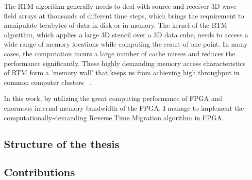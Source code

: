 The RTM algorithm generally needs to deal with source and receiver
3D wave field arrays at thousands of different time steps, which brings
the requirement to manipulate terabytes of data in disk or in memory.
The kernel of the RTM algorithm, which applies a large 3D stencil
over a 3D data cube, needs to access a wide range of memory locations
while computing the result of one point. In many cases, the computation
incurs a large number of cache misses and reduces the performance
significantly. These highly demanding memory access characteristics
of RTM form a 'memory wall' that keeps us from achieving high throughput
in common computer clusters ~\cite{fu11}.

In this work, by utilizing the great computing performance of FPGA
and enormous internal memory bandwidth of the FPGA, I manage to implement
the computationally-demanding Reverse Time Migration algorithm in
FPGA.

\subsection{Structure of the thesis}

\subsection{Contributions}
